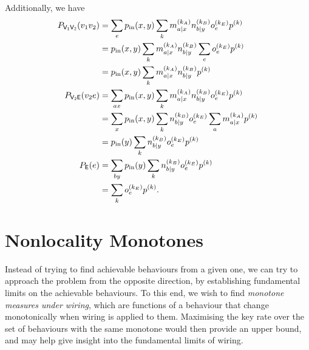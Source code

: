 \documentclass[10pt, a4paper]{article}
\numberwithin{equation}{section} %
\theoremstyle{definition}
\theoremstyle{plain}
\newcommand{\?}{\mathrel{?}} %
\newcommand{\crv}[1]{\mathsf{#1}}
\begin{document}
    Additionally, we have
    \begin{align}
      P_{\crv{V_1V_2}}(v_1v_2) &= \sum_{e} p_{\rm in}(x,y) \sum_k m_{a|x}^{(k_A)} n_{b|y}^{(k_B)} o_e^{(k_E)} p^{(k)} \\
                           &= p_{\rm in}(x,y) \sum_k m_{a|x}^{(k_A)} n_{b|y}^{(k_B)} \sum_e o_e^{(k_E)} p^{(k)} \\
                           &= p_{\rm in}(x,y) \sum_k m_{a|x}^{(k_A)} n_{b|y}^{(k_B)} p^{(k)} \\
      P_{\crv{V_2E}}(v_2e) &= \sum_{ax} p_{\rm in}(x,y) \sum_k m_{a|x}^{(k_A)} n_{b|y}^{(k_B)} o_e^{(k_E)} p^{(k)} \\
                           &= \sum_{x} p_{\rm in}(x,y) \sum_k n_{b|y}^{(k_B)} o_e^{(k_E)} \sum_a m_{a|x}^{(k_A)} p^{(k)} \\
                           &= p_{\rm in}(y) \sum_k n_{b|y}^{(k_B)} o_e^{(k_E)} p^{(k)} \\
      P_{\crv{E}}(e) &= \sum_{by} p_{\rm in}(y) \sum_k n_{b|y}^{(k_B)} o_e^{(k_E)} p^{(k)} \\
                     &= \sum_k o_e^{(k_E)} p^{(k)}.
    \end{align}

    \section{Nonlocality Monotones}\label{sec:nlmono}

    Instead of trying to find achievable behaviours from a given one, we can try to approach the problem from the opposite direction, by establishing fundamental limits on the achievable behaviours. To this end, we wish to find \emph{monotone measures under wiring}, which are functions of a behaviour that change monotonically when wiring is applied to them. Maximising the key rate over the set of behaviours with the same monotone would then provide an upper bound, and may help give insight into the fundamental limits of wiring.
\end{document}
